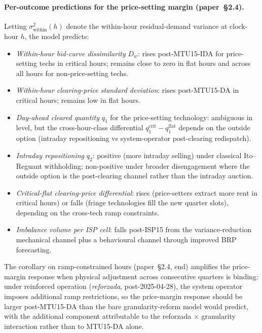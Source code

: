 \documentclass[11pt,a4paper]{article}
\begin{document}
\paragraph{Per-outcome predictions for the price-setting margin (paper~\S2.4).} Letting $\sigma^2_{\text{within}}(h)$ denote the within-hour residual-demand variance at clock-hour $h$, the model predicts:
\begin{itemize}
\item \emph{Within-hour bid-curve dissimilarity} $D_w$: rises post-MTU15-IDA for price-setting techs in critical hours; remains close to zero in flat hours and across all hours for non-price-setting techs.
\item \emph{Within-hour clearing-price standard deviation}: rises post-MTU15-DA in critical hours; remains low in flat hours.
\item \emph{Day-ahead cleared quantity} $q_1$ for the price-setting technology: ambiguous in level, but the cross-hour-class differential $q_1^{\text{crit}} - q_1^{\text{flat}}$ depends on the outside option (intraday repositioning vs system-operator post-clearing redispatch).
\item \emph{Intraday repositioning} $q_2$: positive (more intraday selling) under classical Ito--Reguant withholding; non-positive under broader disengagement where the outside option is the post-clearing channel rather than the intraday auction.
\item \emph{Critical-flat clearing-price differential}: rises (price-setters extract more rent in critical hours) or falls (fringe technologies fill the new quarter slots), depending on the cross-tech ramp constraints.
\item \emph{Imbalance volume per ISP cell}: falls post-ISP15 from the variance-reduction mechanical channel plus a behavioural channel through improved BRP forecasting.
\end{itemize}

The corollary on ramp-constrained hours (paper~\S2.4, end) amplifies the price-margin response when physical adjustment across consecutive quarters is binding: under reinforced operation (\emph{reforzada}, post-2025-04-28), the system operator imposes additional ramp restrictions, so the price-margin response should be larger post-MTU15-DA than the bare granularity-reform model would predict, with the additional component attributable to the reforzada $\times$ granularity interaction rather than to MTU15-DA alone.

\end{document}
